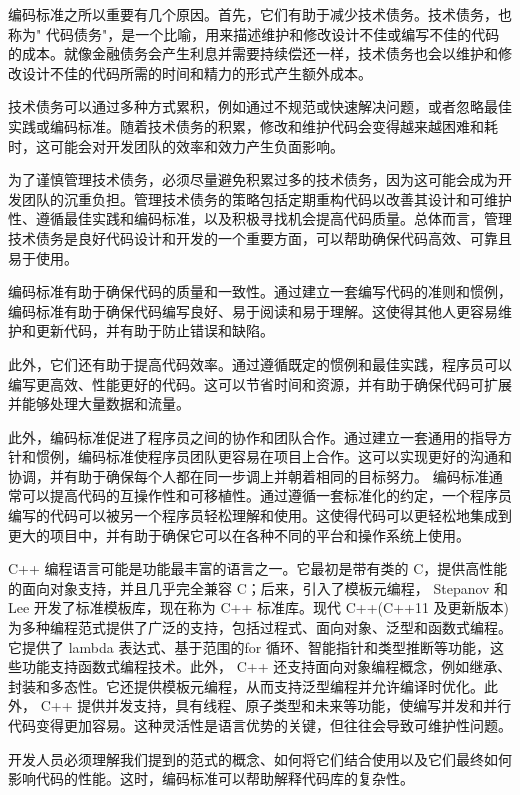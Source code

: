 
编码标准之所以重要有几个原因。首先，它们有助于减少技术债务。技术债务，也称为" 代码债务"，是一个比喻，用来描述维护和修改设计不佳或编写不佳的代码的成本。就像金融债务会产生利息并需要持续偿还一样，技术债务也会以维护和修改设计不佳的代码所需的时间和精力的形式产生额外成本。

技术债务可以通过多种方式累积，例如通过不规范或快速解决问题，或者忽略最佳实践或编码标准。随着技术债务的积累，修改和维护代码会变得越来越困难和耗时，这可能会对开发团队的效率和效力产生负面影响。

为了谨慎管理技术债务，必须尽量避免积累过多的技术债务，因为这可能会成为开发团队的沉重负担。管理技术债务的策略包括定期重构代码以改善其设计和可维护性、遵循最佳实践和编码标准，以及积极寻找机会提高代码质量。总体而言，管理技术债务是良好代码设计和开发的一个重要方面，可以帮助确保代码高效、可靠且易于使用。

编码标准有助于确保代码的质量和一致性。通过建立一套编写代码的准则和惯例，编码标准有助于确保代码编写良好、易于阅读和易于理解。这使得其他人更容易维护和更新代码，并有助于防止错误和缺陷。

此外，它们还有助于提高代码效率。通过遵循既定的惯例和最佳实践，程序员可以编写更高效、性能更好的代码。这可以节省时间和资源，并有助于确保代码可扩展并能够处理大量数据和流量。

此外，编码标准促进了程序员之间的协作和团队合作。通过建立一套通用的指导方针和惯例，编码标准使程序员团队更容易在项目上合作。这可以实现更好的沟通和协调，并有助于确保每个人都在同一步调上并朝着相同的目标努力。
编码标准通常可以提高代码的互操作性和可移植性。通过遵循一套标准化的约定，一个程序员编写的代码可以被另一个程序员轻松理解和使用。这使得代码可以更轻松地集成到更大的项目中，并有助于确保它可以在各种不同的平台和操作系统上使用。

C++ 编程语言可能是功能最丰富的语言之一。它最初是带有类的 C，提供高性能的面向对象支持，并且几乎完全兼容 C；后来，引入了模板元编程， Stepanov 和 Lee 开发了标准模板库，现在称为 C++ 标准库。现代 C++(C++11 及更新版本)为多种编程范式提供了广泛的支持，包括过程式、面向对象、泛型和函数式编程。它提供了 lambda 表达式、基于范围的for 循环、智能指针和类型推断等功能，这些功能支持函数式编程技术。此外， C++ 还支持面向对象编程概念，例如继承、封装和多态性。它还提供模板元编程，从而支持泛型编程并允许编译时优化。此外， C++ 提供并发支持，具有线程、原子类型和未来等功能，使编写并发和并行代码变得更加容易。这种灵活性是语言优势的关键，但往往会导致可维护性问题。

开发人员必须理解我们提到的范式的概念、如何将它们结合使用以及它们最终如何影响代码的性能。这时，编码标准可以帮助解释代码库的复杂性。

